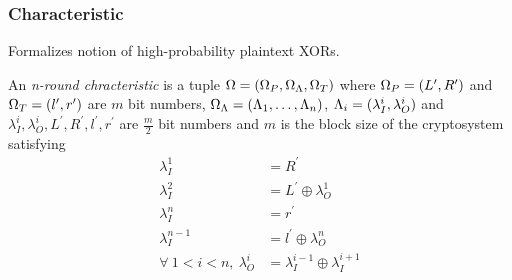 \documentclass{beamer}
\begin{document}
	\begin{frame}
		\frametitle{Characteristic}
		Formalizes notion of high-probability plaintext XORs.
		\begin{definition}[Characteristic]
			An \emph{n-round chracteristic} is a tuple \(\Omega =
			(\Omega_P, \Omega_\Lambda, \Omega_T)\) where \(\Omega_P =
			(L^\prime, R^\prime)\) and \(\Omega_T = (l^\prime,
			r^\prime)\) are \(m\) bit numbers, \(\Omega_\Lambda =
			(\Lambda_1, \ldots, \Lambda_n)\), \(\Lambda_i =
			(\lambda_I^i, \lambda_O^i)\) and \(\lambda_I^i,
			\lambda_O^i, L^\prime, R^\prime, l^\prime, r^\prime\) are
			\(\frac{m}{2}\) bit numbers and \(m\) is the block size of the
			cryptosystem satisfying
			\begin{align}
				\lambda_I^1 &= R^\prime \\
				\lambda_I^2 &= L^\prime \oplus \lambda_O^1 \\
				\lambda_I^n &= r^\prime \\
				\lambda_I^{n-1} &= l^\prime \oplus \lambda_O^n \\
				\forall\ 1 < i < n,\ \lambda_O^i &= \lambda_I^{i-1} \oplus \lambda_I^{i+1}
				\label{eq:char-def}
			\end{align}
		\end{definition}
	\end{frame}
\end{document}
